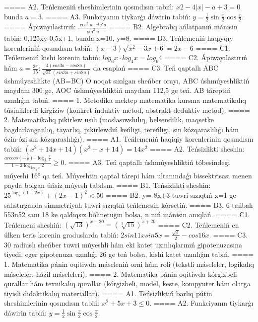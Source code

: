 ====
A2. Teńlemeniń sheshimlerinin qosındısın tabıń: \(x2 - 4|x| - a + 3 = 0\) bunda \(a = 3\).
====
A3. Funkciyanın tiykarģı dáwirin tabiń: \(y = \frac{1}{2}\sin{\frac{x}{2}\cos\frac{x}{2}}\).
====
Ápiwayılastırıń: \(\frac{\cos^{2}a \cdot {ctg}^{2}a}{\sin^{2}a}\)
====
B2. Algebralıq ańlatpanıń mánisin tabiń: 0,125xy-0,5x+1, bunda x=10, y=8.
====
B3. Teńlemeniń haqıyqıy korenleriniń qosındısın tabiń: \((x-3) \sqrt{x^{2} - 3x + 6} = 2x - 6\)
====
C1. Teńlemeniń kishi korenin tabiń: \(log_{6}x \cdot log_{4}x = log_{6}4\)
====
C2. Ápiwayılastırıń hám \(a = \frac{2\pi}{15}:\frac{4 (cos3a - cos8a) }{\sqrt{31} (sin3a + sin8a) }\) da esaplań
====
C3. Teń qaptallı ABC úshmúyeshlikte (AB=BC) O noqat sızılgan sheńber orayı, ABC úshmúyeshliktiń maydanı 300 ge, AOC úshmúyeshliktiń maydanı 112,5 ge teń. AB táreptiń uzınlıǵın tabıń.
====
1. Metodika mektep matematika kursına matematikalıq túsiniklerdi kirgiziw (konkret induktiv metod, abstrakt-deduktiv metod).
====
2. Matematikalıq pikirlew usılı (moslasıwshılıq, belsendilik, maqsetke bagdarlanganlıq, tayarlıq, pikirlewdiń keńligi, tereńligi, sın kózqaraslılıǵı hám ózin-ózi sın kózqaraslılıǵı).
====
A1. Teńlemeniń haqiqiy korenlerinin qosındısın tabiń: \((x^2 + 14x + 14) (x^2 + x + 14) = 14x^2\)
====
A2. Teńsizlikti sheshin: \(\frac{arccos (- \frac{3}{\pi}) \cdot \log_{\frac{3}{\pi}}\frac{\pi}{4}}{1 - 2\log_{\log_{2}x}2} \geq 0\).
====
A3. Teń qaptallı úshmúyeshliktiń tóbesindegi múyeshi 16° qa teń. Múyeshtin qaptal tárepi hám ultanındaǵı bissektrisası menen payda bolgan úńsiz múyesh tabılsın.
====
B1. Teńsizlikti sheshin: \(25^{\log_{5}{ (1 - 2x) }} + { (2x - 1) }^{2} < 50\)
====
B2. y=-8x+3 tuwri sızıqtıń x=1 ge salıstırganda simmetriyalı tuwri sızıqtıń teńlemesin kórsetiń.
====
B3. 6 tańbalı 553n52 sanı 18 ke qaldıqsız bólinetuģın bolsa, n niń mánisin anıqlań.
====
C1. Teńlemeni sheshiń: \((\sqrt{13}) ^{x + 20} = (\sqrt[3]{15}) ^{x + 20}\)
====
C2. Teńlemeniń en úlken teris korenin graduslarda tabiń: \(2sin11xsin5x = \frac{\sqrt{3}}{2} - cos16x\).
====
C3. 30 radiuslı sheńber tuwri múyeshli hám eki katet uzınlıqlarınıń gipotenuzasına tiyedi, eger gipotenuza uzınlıǵı 26 ge teń bolsa, kishi katet uzınlıǵın tabıń.
====
1. Matematika pánin oqitiwda máseleniń orni hám roli (tekstli máseleler, logikalıq máseleler, házil máseleleri).
====
2. Matematika pánin oqitiwda kórgizbeli qurallar hám texnikalıq qurallar (kórgizbeli, model, keste, kompyuter hám olarga tiyisli didaktikalıq materiallar).
====
A1. Teńsizliktiń barlıq pútin sheshimlerinin qosındısın tabiń: \(x^2 + 5x + 3 \leq 0\).
====
A2. Funkciyanın tiykarģı dáwirin tabiń: \(y = \frac{1}{2}\sin{\frac{x}{2}\cos\frac{x}{2}}\).
